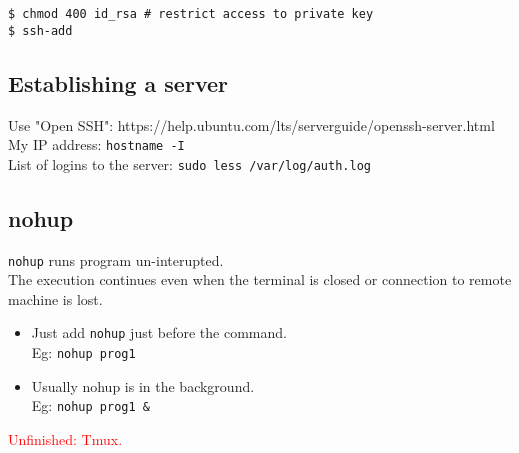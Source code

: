 \begin{itemize}
\texttt{\$ chmod 400 id\_rsa \# restrict access to private key}\\
\texttt{\$ ssh-add} \\

\end{itemize}


\subsection{Establishing a server}
Use "Open SSH": https://help.ubuntu.com/lts/serverguide/openssh-server.html\\

My IP address: \texttt{hostname -I}\\
List of logins to the server: \texttt{sudo less /var/log/auth.log}\\

\subsection{nohup}
\texttt{nohup} runs program un-interupted. \\
The execution continues even when the terminal is closed or connection to remote machine is lost.\\
\begin{itemize}
\item Just add \texttt{nohup} just before the command. \\
Eg: \texttt{nohup prog1}
\item Usually nohup is in the background.\\
Eg: \texttt{nohup prog1 \&}
\end{itemize}

\textcolor{red}{Unfinished: Tmux.}

\vfill \null
\columnbreak
